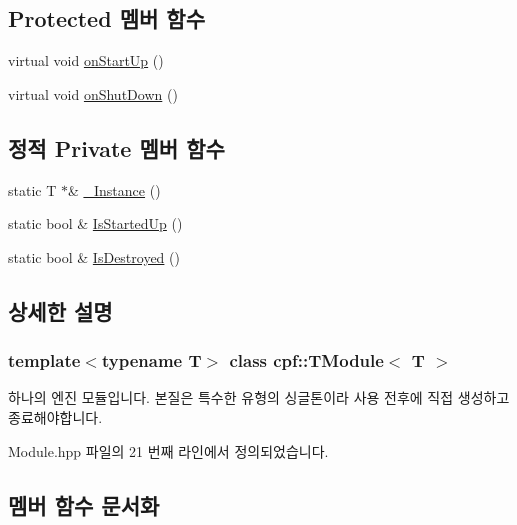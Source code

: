 \subsection*{Protected 멤버 함수}
\begin{DoxyCompactItemize}
\item 
virtual void \hyperlink{classcpf_1_1_t_module_a4eb83b0848794e422d2d345439f51a04}{on\+Start\+Up} ()
\item 
virtual void \hyperlink{classcpf_1_1_t_module_a15c93b1aca54022e145961bea8e3ea7d}{on\+Shut\+Down} ()
\end{DoxyCompactItemize}
\subsection*{정적 Private 멤버 함수}
\begin{DoxyCompactItemize}
\item 
static T $\ast$\& \hyperlink{classcpf_1_1_t_module_a06ab8af8ea6b294959937fd2bbc1e615}{\+\_\+\+Instance} ()
\item 
static bool \& \hyperlink{classcpf_1_1_t_module_a73732afee7131dad652bf3e00c75cef9}{Is\+Started\+Up} ()
\item 
static bool \& \hyperlink{classcpf_1_1_t_module_a9f70f0a70ac59b13b7a874f82c877337}{Is\+Destroyed} ()
\end{DoxyCompactItemize}


\subsection{상세한 설명}
\subsubsection*{template$<$typename T$>$\newline
class cpf\+::\+T\+Module$<$ T $>$}

하나의 엔진 모듈입니다. 본질은 특수한 유형의 싱글톤이라 사용 전후에 직접 생성하고 종료해야합니다. 

Module.\+hpp 파일의 21 번째 라인에서 정의되었습니다.



\subsection{멤버 함수 문서화}
\mbox{\label{classcpf_1_1_t_module_a06ab8af8ea6b294959937fd2bbc1e615}} 
